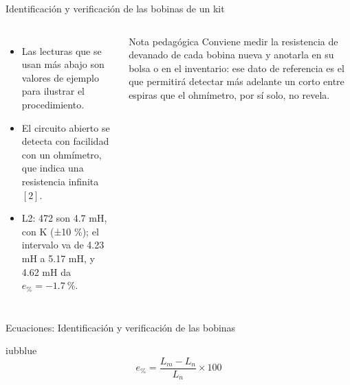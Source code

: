 \documentclass[aspectratio=169,11pt,xcolor={table}]{beamer}
\begin{document}
\begin{frame}{{\normalsize Identificación y verificación de las bobinas de un kit}}
\begin{columns}[c,onlytextwidth]
\small
\begin{itemize}\setlength{\itemsep}{4pt}
  \item Las lecturas que se usan más abajo son valores de ejemplo para ilustrar el procedimiento.
  \item El circuito abierto se detecta con facilidad con un ohmímetro, que indica una resistencia infinita $[2]$.
  \item L2: 472 son 4.7 mH, con K (±10 \%); el intervalo va de 4.23 mH a 5.17 mH, y 4.62 mH da $e_{\%} = -1.7\ \%$.
\end{itemize}
\begin{cardO}{Nota pedagógica}
\footnotesize Conviene medir la resistencia de devanado de cada bobina nueva y anotarla en su bolsa o en el inventario: ese dato de referencia es el que permitirá detectar más adelante un corto entre espiras que el ohmímetro, por sí solo, no revela.
\end{cardO}
\end{columns}
\end{frame}

\begin{frame}{{\normalsize Ecuaciones: Identificación y verificación de las bobinas}}
\begin{cajaplana}{iubblue}
\centering
{\large
\begin{equation*}
  e_{\text{\%}} = \frac{L_{m} - L_{n}}{L_{n}} \times 100
\end{equation*}
}
\end{cajaplana}
\end{frame}
\end{document}

